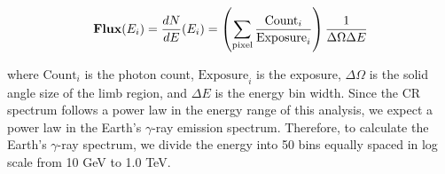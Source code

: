
\begin{equation}
    \textbf{Flux}(E_i) =  \frac{dN}{dE}(E_i) = \left(\sum_{\rm pixel} \frac{\text{Count}_i}{\text{Exposure}_i}\right) \frac{1}{\Delta\Omega\Delta E}
    \label{eq:def_flux}
\end{equation}

\noindent where $\text{Count}_i$ is the photon count,
$\text{Exposure}_i$ is the exposure, $\Delta\Omega$
is the solid angle size of the limb region, and $\Delta E$ is the energy
bin width.
Since the CR spectrum follows a power law in the energy range
of this analysis, we expect a power law in the Earth's
$\gamma$-ray emission spectrum. Therefore, to calculate the
Earth's $\gamma$-ray spectrum, we divide the energy into 50 bins
equally spaced in log scale from 10 GeV to 1.0 TeV.




